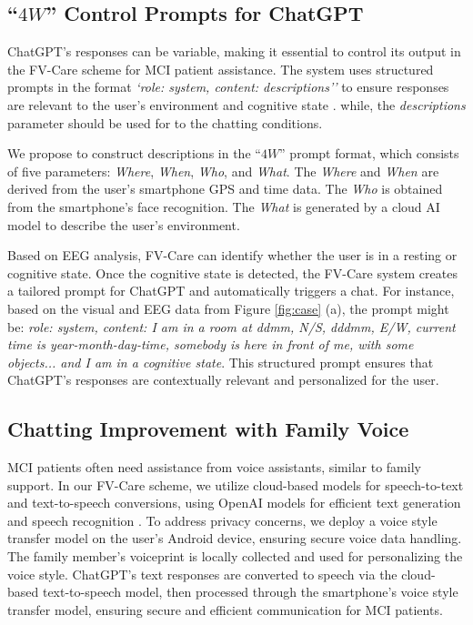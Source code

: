 \documentclass[conference]{IEEEtran}
\begin{document}
\subsection{``$4W$'' Control Prompts for ChatGPT}

ChatGPT's responses can be variable, making it essential to control its output in the FV-Care scheme for MCI patient assistance. The system uses structured prompts in the format \textit{`role: system, content: descriptions''} to ensure responses are relevant to the user's environment and cognitive state \cite{openai_api}. while, the \textit{descriptions} parameter should be used for to the chatting conditions. 

We propose to construct descriptions in the ``$4W$'' prompt format, which consists of five parameters: \textit{Where}, \textit{When}, \textit{Who}, and \textit{What}. The \textit{Where} and \textit{When} are derived from the user's smartphone GPS and time data. The \textit{Who} is obtained from the smartphone's face recognition. The \textit{What} is generated by a cloud AI model to describe the user's environment. 

Based on EEG analysis, FV-Care can identify whether the user is in a resting or cognitive state. Once the cognitive state is detected, the FV-Care system creates a tailored prompt for ChatGPT and automatically triggers a chat. For instance, based on the visual and EEG data from Figure \ref{fig:case} (a), the prompt might be: \textit{role: system, content: I am in a room at ddmm, N/S, dddmm, E/W, current time is year-month-day-time, somebody is here in front of me, with some objects... and I am in a cognitive state}. This structured prompt ensures that ChatGPT's responses are contextually relevant and personalized for the user.



\subsection{Chatting Improvement with Family Voice}

MCI patients often need assistance from voice assistants, similar to family support. In our FV-Care scheme, we utilize cloud-based models for speech-to-text and text-to-speech conversions, using OpenAI models for efficient text generation \cite{openai_tts} and speech recognition \cite{openai_stt}. To address privacy concerns, we deploy a voice style transfer model \cite{voicetran} on the user’s Android device, ensuring secure voice data handling. The family member’s voiceprint is locally collected and used for personalizing the voice style. 
ChatGPT's text responses are converted to speech via the cloud-based text-to-speech model, then processed through the smartphone's voice style transfer model, ensuring secure and efficient communication for MCI patients.
\end{document}
